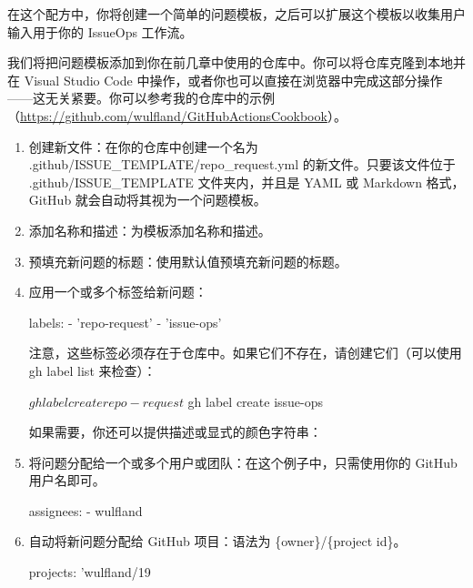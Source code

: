 在这个配方中，你将创建一个简单的问题模板，之后可以扩展这个模板以收集用户输入用于你的 IssueOps 工作流。


我们将把问题模板添加到你在前几章中使用的仓库中。你可以将仓库克隆到本地并在 Visual Studio Code 中操作，或者你也可以直接在浏览器中完成这部分操作——这无关紧要。你可以参考我的仓库中的示例（\url{https://github.com/wulfland/GitHubActionsCookbook}）。


\begin{enumerate}
\item 
创建新文件：在你的仓库中创建一个名为 .github/ISSUE_TEMPLATE/repo\_request.yml 的新文件。只要该文件位于 .github/ISSUE\_TEMPLATE 文件夹内，并且是 YAML 或 Markdown 格式，GitHub 就会自动将其视为一个问题模板。

\item 
添加名称和描述：为模板添加名称和描述。


\item 
预填充新问题的标题：使用默认值预填充新问题的标题。


\item 
应用一个或多个标签给新问题：

\begin{shell}
labels:
  - 'repo-request'
  - 'issue-ops'
\end{shell}

注意，这些标签必须存在于仓库中。如果它们不存在，请创建它们（可以使用 gh label list 来检查）：

\begin{shell}
$ gh label create repo-request
$ gh label create issue-ops
\end{shell}

如果需要，你还可以提供描述或显式的颜色字符串：


\item 
将问题分配给一个或多个用户或团队：在这个例子中，只需使用你的 GitHub 用户名即可。

\begin{shell}
assignees:
  - wulfland
\end{shell}

\item 
自动将新问题分配给 GitHub 项目：语法为 \{owner\}/\{project id\}。

\begin{shell}
projects: 'wulfland/19
\end{shell}
\end{enumerate}


